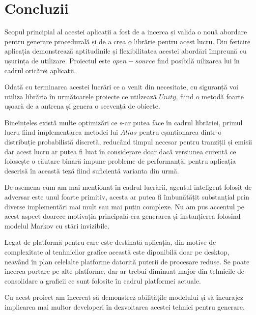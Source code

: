 \chapter*{Concluzii} 

Scopul principial al acestei aplicații a fost de a incerca și valida o nouă abordare pentru generare procedurală și de a crea o librărie pentru acest lucru. Din fericire aplicația demonstrează aptitudinile și flexibilitatea acestei abordări împreună cu ușurința de utilizare. Proiectul este $open-source$ find posibilă uilizarea lui în cadrul oricărei aplicații.\par

Odată cu terminarea acestei lucrări ce a venit din necesitate, cu siguranță voi utiliza librăria în următoarele proiecte ce utilzează $Unity$, fiind o metodă foarte ușoară de a antrena și genera o secvență de obiecte.\par

Bineînțeles există multe optimizări ce s-ar putea face în cadrul librăriei, primul lucru fiind implementarea metodei lui $Alias$ pentru eșantionarea dintr-o distribuție probabilistă discretă, reducând timpul necesar pentru tranziții și emisii dar acest lucru ar putea fi luat în considerare doar dacă versiunea curentă ce folosește o căutare binară impune probleme de performanță, pentru aplicația descrisă în această teză fiind suficientă varianta din urmă.\par

De asemena cum am mai menționat în cadrul lucrării, agentul inteligent folosit de adversar este unul foarte primitiv, acesta ar putea fi îmbunătățit substanțial prin diverse implementări mai mult sau mai puțin complexe. Nu am pus accentul pe acest aspect doarece motivația principală era generarea și instanțierea folosind modelul Markov cu stări invizibile.\par

Legat de platformă pentru care este destinată aplicația, din motive de complexitate al tenhnicilor grafice această este diponibilă doar pe desktop, neavând în plan celelalte platforme datorită puterii de procesare reduse. Se poate încerca portare pe alte platforme, dar ar trebui diminuat major din tehnicile de consolidare a graficii ce sunt folosite în cadrul platformei actuale.\par

Cu acest proiect am încercat să demonstrez abilitățile modelului și să încurajez implicarea mai multor developeri în dezvoltarea acestei tehnici pentru generare.\par
